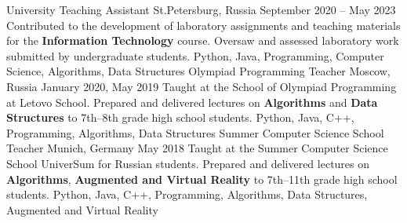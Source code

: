 
\begin{works}
    \work 
        {University Teaching Assistant} {} {St.Petersburg, Russia} {September 2020 -- May 2023}
        {
            Contributed to the development of laboratory assignments and teaching materials for the \textbf{Information Technology} course. \mbox{Oversaw} and assessed laboratory work submitted by undergraduate students.
        }
        {
            Python, Java, Programming, Computer Science, Algorithms, Data Structures
        }
    \work
        {Olympiad Programming Teacher} {} {Moscow, Russia} {January 2020, May 2019}
        {
            Taught at the School of Olympiad Programming at Letovo School. Prepared and delivered lectures on \textbf{Algorithms} and \textbf{Data \mbox{Structures}} to 7th–8th grade high school students.
        }
        {Python, Java, C++, Programming, Algorithms, Data Structures}
    \work
        {Summer Computer Science School Teacher} {} {Munich, Germany} {May 2018}
        {
            Taught at the Summer Computer Science School UniverSum for Russian students. Prepared and delivered lectures on \textbf{Algorithms}, \textbf{Augmented and Virtual Reality} to 7th–11th grade high school students.
        }
        {Python, Java, C++, Programming, Algorithms, Data Structures, Augmented and Virtual Reality}
\end{works}